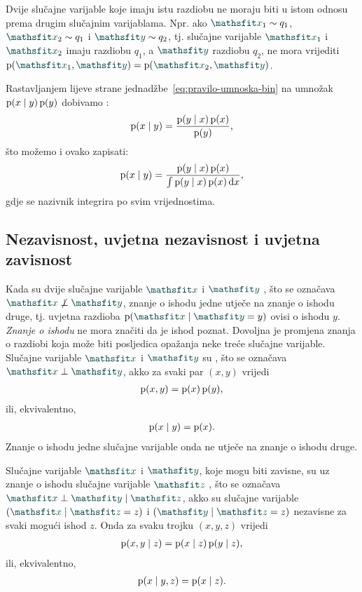 \documentclass[utf8, diplomski, lmodern]{fer}
\begin{document}
Dvije slučajne varijable koje imaju istu razdiobu ne moraju biti u istom odnosu prema drugim slučajnim varijablama. Npr. ako $\rvar x_1\sim q_1$, $\rvar x_2\sim q_1$ i $\rvar y\sim q_2$, tj. slučajne varijable $\rvar x_1$ i $\rvar x_2$ imaju razdiobu $q_1$, a $\rvar y$ razdiobu $q_2$, ne mora vrijediti $\p(\rvar x_1, \rvar y) = \p(\rvar x_2, \rvar y)$.

Rastavljanjem lijeve strane jednadžbe~\eqref{eq:pravilo-umnoska-bin} na umnožak $\operatorname*{\mathrm{p}}(x\mid y)\operatorname*{\mathrm{p}}(y)$ dobivamo :
\begin{align}
\operatorname*{\mathrm{p}}(x\mid y) = \frac{\operatorname*{\mathrm{p}}(y\mid x)\operatorname*{\mathrm{p}}(x)}{\operatorname*{\mathrm{p}}(y)} \text{,}
\end{align}
što možemo i ovako zapisati:
\begin{align}
\operatorname*{\mathrm{p}}(x\mid y) = \frac{\operatorname*{\mathrm{p}}(y\mid x)\operatorname*{\mathrm{p}}(x)}{\int\operatorname*{\mathrm{p}}(y\mid x)\operatorname*{\mathrm{p}}(x)\mathop{}\!\mathrm{d} x} \text{,}
\end{align}
gdje se nazivnik integrira po svim vrijednostima.

\subsection{Nezavisnost, uvjetna nezavisnost i uvjetna zavisnost}

Kada su dvije slučajne varijable $\rvar x$ i $\rvar y$ , što se označava $\rvar x\not\perp\rvar y$, znanje o ishodu jedne utječe na znanje o ishodu druge, tj. uvjetna razdioba $\p\del{\rvar x\mid\rvar y = y}$ ovisi o ishodu $y$. \textit{Znanje o ishodu} ne mora značiti da je ishod poznat. Dovoljna je promjena znanja o razdiobi koja može biti posljedica opažanja neke treće slučajne varijable. Slučajne varijable $\rvar x$ i $\rvar y$ su , što se označava $\rvar x\perp\rvar y$, akko za svaki par $(x, y)$ vrijedi
\begin{align}
\operatorname*{\mathrm{p}}(x,y)=\operatorname*{\mathrm{p}}(x)\operatorname*{\mathrm{p}}(y) \text{,}
\end{align}
ili, ekvivalentno,
\begin{align}
\operatorname*{\mathrm{p}}(x\mid y) = \operatorname*{\mathrm{p}}(x) \text{.}
\end{align}
Znanje o ishodu jedne slučajne varijable onda ne utječe na znanje o ishodu druge.

Slučajne varijable $\rvar x$ i $\rvar y$, koje mogu biti zavisne, su uz znanje o ishodu slučajne varijable $\rvar z$ , što se označava $\rvar x\perp\rvar y\mid\rvar z$, akko su slučajne varijable $\del{\rvar x\mid\rvar z=z}$ i $\del{\rvar y\mid\rvar z=z}$ nezavisne za svaki mogući ishod $z$. Onda za svaku trojku $(x,y,z)$ vrijedi
\begin{align}
\operatorname*{\mathrm{p}}(x,y\mid z) = \operatorname*{\mathrm{p}}(x\mid z)\operatorname*{\mathrm{p}}(y\mid z) \text{,}
\end{align}
 ili, ekvivalentno,
\begin{align}
\operatorname*{\mathrm{p}}(x\mid y,z) = \operatorname*{\mathrm{p}}(x\mid z) \text{.}
\end{align}
\end{document}

